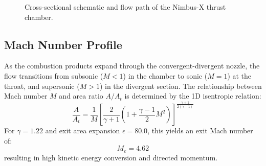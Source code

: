 \begin{figure}[H]
    \caption{Cross-sectional schematic and flow path of the Nimbus-X thrust chamber.}
    \label{fig:nozzle_contour}
\end{figure}

\subsection{Mach Number Profile}
As the combustion products expand through the convergent-divergent nozzle, the flow transitions from subsonic ($M < 1$) in the chamber to sonic ($M = 1$) at the throat, and supersonic ($M > 1$) in the divergent section. 
The relationship between Mach number $M$ and area ratio $A/A_t$ is determined by the 1D isentropic relation:
\begin{equation}
    \frac{A}{A_t} = \frac{1}{M} \left[ \frac{2}{\gamma+1} \left( 1 + \frac{\gamma-1}{2} M^2 \right) \right]^{\frac{\gamma+1}{2(\gamma-1)}}
\end{equation}
For $\gamma = 1.22$ and exit area expansion $\epsilon = 80.0$, this yields an exit Mach number of:
\begin{equation}
    M_e = 4.62
\end{equation}
resulting in high kinetic energy conversion and directed momentum.
